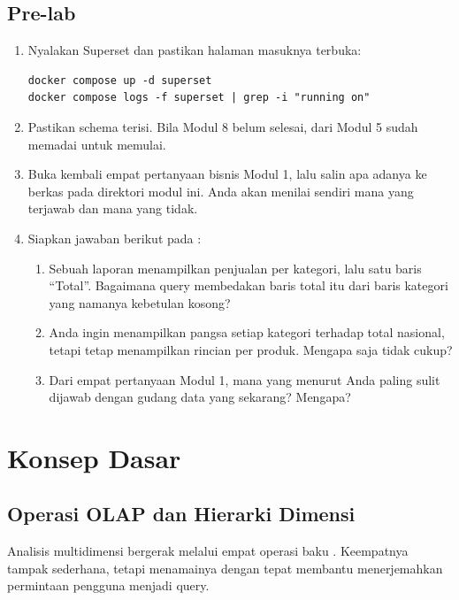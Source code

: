 \subsection{Pre-lab}

\begin{enumerate}[leftmargin=1.4em]
  \item Nyalakan Superset dan pastikan halaman masuknya terbuka:
\begin{lstlisting}[style=shellgaya]
docker compose up -d superset
docker compose logs -f superset | grep -i "running on"
\end{lstlisting}
  \item Pastikan schema  terisi. Bila Modul 8 belum selesai,
         dari Modul 5 sudah memadai untuk
        memulai.
  \item Buka kembali empat pertanyaan bisnis Modul 1, lalu salin apa adanya ke
        berkas  pada direktori modul ini. Anda
        akan menilai sendiri mana yang terjawab dan mana yang tidak.
  \item Siapkan jawaban berikut pada :
  \begin{enumerate}[label=\alph*.,leftmargin=1.4em]
    \item Sebuah laporan menampilkan penjualan per kategori, lalu satu baris
          ``Total''. Bagaimana query membedakan baris total itu dari baris
          kategori yang namanya kebetulan kosong?
    \item Anda ingin menampilkan pangsa setiap kategori terhadap total
          nasional, tetapi tetap menampilkan rincian per produk. Mengapa
           saja tidak cukup?
    \item Dari empat pertanyaan Modul 1, mana yang menurut Anda paling sulit
          dijawab dengan gudang data yang sekarang? Mengapa?
  \end{enumerate}
\end{enumerate}

\section{Konsep Dasar}

\subsection{Operasi OLAP dan Hierarki Dimensi}

Analisis multidimensi bergerak melalui empat operasi baku
\citep{vaisman2022}. Keempatnya tampak sederhana, tetapi menamainya dengan
tepat membantu menerjemahkan permintaan pengguna menjadi query.

